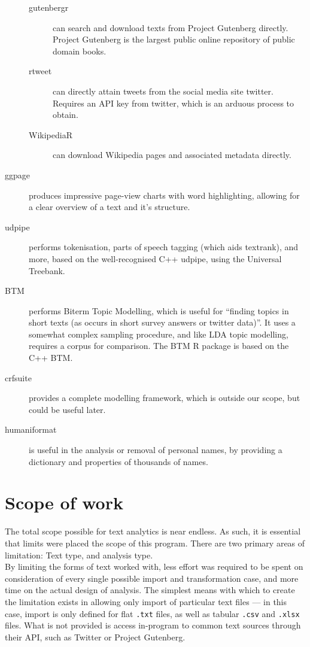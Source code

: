 \message{ !name(jason-cairns-dissertation.tex)}\documentclass[11pt, a4paper, titlepage]{report}
\begin{document}
\begin{description}
\begin{description}
  \item[gutenbergr\autocite{robinson19}] can search and download texts
    from Project Gutenberg directly. Project Gutenberg is the largest
    public online repository of public domain books.
  \item[rtweet\autocite{rtweet-package}] can directly attain tweets from
    the social media site twitter. Requires an API key from twitter,
    which is an arduous process to obtain.
  \item[WikipediaR\autocite{bar-hen16:_wikip}] can download Wikipedia
    pages and associated metadata directly.
  \end{description}
\item[ggpage\autocite{hvitfeldt19ggpage}] produces impressive
  page-view charts with word highlighting, allowing for a clear
  overview of a text and it's structure.
\item[udpipe\autocite{wijffels19:udpipe}] performs tokenisation, parts
  of speech tagging (which aids textrank), and more, based on the
  well-recognised C++ udpipe, using the Universal Treebank.
\item[BTM\autocite{wijffels19:_btm}] performs Biterm Topic Modelling,
  which is useful for ``finding topics in short texts (as occurs in
  short survey answers or twitter data)''. It uses a somewhat complex
  sampling procedure, and like LDA topic modelling, requires a corpus
  for comparison. The BTM R package is based on the C++ BTM.\
\item[crfsuite\autocite{wijffels18crf}] provides a complete modelling
  framework, which is outside our scope, but could be useful later.
\item[humaniformat\autocite{keyes16}] is useful in the analysis or
  removal of personal names, by providing a dictionary and properties of
  thousands of names.
\end{description}

\section{Scope of work}\label{sec:scope-work}

The total scope possible for text analytics is near endless. As such,
it is essential that limits were placed the scope of this program.
There are two primary areas of limitation: Text type, and analysis type.\\

By limiting the forms of text worked with, less effort was required to
be spent on consideration of every single possible import and
transformation case, and more time on the actual design of analysis.
The simplest means with which to create the limitation exists in
allowing only import of particular text files --- in this case, import
is only defined for flat \texttt{.txt} files, as well as tabular
\texttt{.csv} and \texttt{.xlsx} files. What is not provided is access
in-program to common text sources through their API, such as Twitter
or Project Gutenberg.
\end{document}
